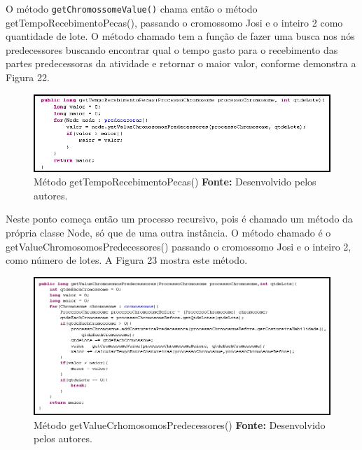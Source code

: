 \par O método \texttt{getChromossomeValue()} chama então o método getTempoRecebimentoPecas(), passando o cromossomo Josi e 
o inteiro 2 como quantidade de lote. O método chamado tem a função de fazer uma busca nos nós predecessores buscando encontrar 
qual o tempo gasto para o recebimento das partes predecessoras da atividade e retornar o maior valor, 
conforme demonstra a Figura 22.

\begin{figure}[h!]
	\centerline{\includegraphics[scale=0.8]{./imagens/metodo_getTempoRecebimentoPecas.png}}
	\caption[Método getTempoRecebimentoPecas()]
	{Método getTempoRecebimentoPecas() \textbf{Fonte:} Desenvolvido pelos autores.}
	\label{fig:exemplo1}
\end{figure}

\newpage

\par Neste ponto começa então um processo recursivo, pois é chamado um método da
própria classe Node, só que de uma outra instância.
O método chamado é o getValueChromosomosPredecessores() passando o cromossomo
Josi e o inteiro 2, como número de lotes.
A Figura 23 mostra este método.

\begin{figure}[h!]
	\centerline{\includegraphics[scale=0.6]{./imagens/metodo_getValueCrhomosomosPredecessores.png}}
	\caption[Método getValueCrhomosomosPredecessores()]
	{Método getValueCrhomosomosPredecessores() \textbf{Fonte:} Desenvolvido pelos
	autores.}
	\label{fig:exemplo1}
\end{figure}

